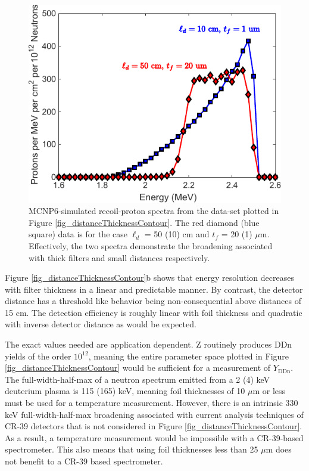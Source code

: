 \begin{figure}[h!]
	
	\centering
	\includegraphics[scale=1.5]{Figures/recoilProtonSpectra.pdf}
	\caption{MCNP6-simulated recoil-proton spectra from the data-set plotted in Figure \ref{fig_distanceThicknessContour}. The red diamond (blue square) data is for the case $\ell_d$ = 50 (10) cm and $t_f$ = 20 (1) $\mu$m. Effectively, the two spectra demonstrate the broadening associated with thick filters and small distances respectively.}
	\label{fig_recoilProtonSpectra}
	
\end{figure}

Figure \ref{fig_distanceThicknessContour}b shows that energy resolution decreases with filter thickness in a linear and predictable manner. By contrast, the detector distance has a threshold like behavior being non-consequential above distances of 15 cm. The detection efficiency is roughly linear with foil thickness and quadratic with inverse detector distance as would be expected. 

The exact values needed are application dependent. Z routinely produces DDn yields of the order $10^{12}$, meaning the entire parameter space plotted in Figure \ref{fig_distanceThicknessContour} would be sufficient for a measurement of $Y_{\mathrm{DDn}}$. The full-width-half-max of a neutron spectrum emitted from a 2 (4) keV deuterium plasma is 115 (165) keV, meaning foil thicknesses of 10 $\mu$m or less must be used for a temperature measurement. However, there is an intrinsic 330 keV full-width-half-max broadening associated with current analysis techniques of CR-39 detectors that is not considered in Figure \ref{fig_distanceThicknessContour}. \cite{SRF_RSI} As a result, a temperature measurement would be impossible with a CR-39-based spectrometer. This also means that using foil thicknesses less than 25 $\mu$m does not benefit to a CR-39 based spectrometer. 

